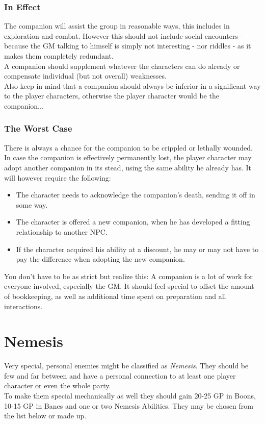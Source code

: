\documentclass[12pt,a4paper,openany,usenames,dvipsnames]{book}
\begin{document}
	\subsection{In Effect}
	The companion will assist the group in reasonable ways, this includes in exploration and combat. However this should not include social encounters - because the GM talking to himself is simply not interesting - nor riddles - as it makes them completely redundant.\\
	A companion should supplement whatever the characters can do already or compensate individual (but not overall) weaknesses.\\
	Also keep in mind that a companion should always be inferior in a significant way to the player characters, otherwise the player character would be the companion...
	\subsection{The Worst Case}
	There is always a chance for the companion to be crippled or lethally wounded. In case the companion is effectively permanently lost, the player character may adopt another companion in its stead, using the same ability he already has. It will however require the following:
	\vspace{-8mm}
	\begin{itemize}
		\setlength\itemsep{-8mm}
		\item The character needs to acknowledge the companion's death, sending it off in some way.
		\item The character is offered a new companion, when he has developed a fitting relationship to another NPC.
		\item If the character acquired his ability at a discount, he may or may not have to pay the difference when adopting the new companion.
	\end{itemize}
	\begin{exampleblock}
		You don't have to be as strict but realize this:
		A companion is a lot of work for everyone involved, especially the GM.
		It should feel special to offset the amount of bookkeeping,
			as well as additional time spent on preparation and all interactions.
	\end{exampleblock}
	

	\chapter{Nemesis}
	Very special, personal enemies might be classified as \emph{Nemesis}.
	They should be few and far between and have a personal connection to at least one player character or even the whole party.\\
	To make them special mechanically as well they should gain 20-25 GP in Boons,
		10-15 GP in Banes
		and one or two Nemesis Abilities.
	They may be chosen from the list below or made up.
\end{document}
